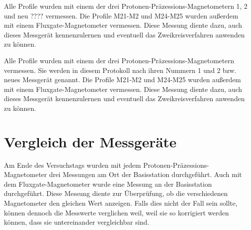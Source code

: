 Alle Profile wurden mit einem der drei Protonen-Präzessions-Magnetometern 1, 2 und neu ???? vermessen. Die Profile M21-M2 und M24-M25 wurden außerdem mit einem Fluxgate-Magnetometer vermessen. Diese Messung diente dazu, auch dieses Messgerät kennenzulernen und eventuell das Zweikreisverfahren anwenden zu können.

Alle Profile wurden mit einem der drei Protonen-Präzessions-Magnetometern vermessen. Sie werden in diesem Protokoll nach ihren Nummern 1 und 2 bzw. neues Messgerät genannt. Die Profile M21-M2 und M24-M25 wurden außerdem mit einem Fluxgate-Magnetometer vermessen. Diese Messung diente dazu, auch dieses Messgerät kennenzulernen und eventuell das Zweikreisverfahren anwenden zu können.


\section{Vergleich der Messgeräte}

Am Ende des Versuchstags wurden mit jedem Protonen-Präzessions-Magnetometer drei Messungen am Ort der Basisstation durchgeführt. Auch mit dem Fluxgate-Magnetometer wurde eine Messung an der Basisstation durchgeführt. Diese Messung diente zur Überprüfung, ob die verschiedenen Magnetometer den gleichen Wert anzeigen. Falls dies nicht der Fall sein sollte, können dennoch die Messwerte verglichen weil, weil sie so korrigiert werden können, dass sie untereinander vergleichbar sind.